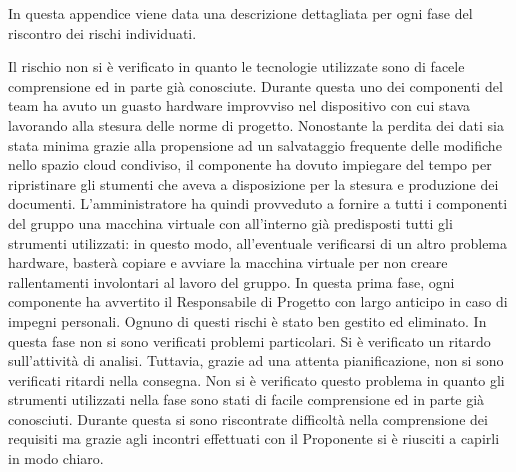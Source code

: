 	In questa appendice viene data una descrizione dettagliata per ogni fase del riscontro dei rischi individuati.


		Il rischio non si è verificato in quanto le tecnologie utilizzate sono di facele comprensione ed in parte già conosciute.
		Durante questa  uno dei componenti del team ha avuto un guasto hardware improvviso nel dispositivo con cui stava lavorando alla stesura delle norme di progetto. Nonostante la perdita dei dati sia stata minima grazie alla propensione ad un salvataggio frequente delle modifiche nello spazio cloud condiviso, il componente ha dovuto impiegare del tempo per ripristinare gli stumenti che aveva a disposizione per la stesura e produzione dei documenti. L'amministratore ha quindi provveduto a fornire a tutti i componenti del gruppo una macchina virtuale con all'interno già predisposti tutti gli strumenti utilizzati: in questo modo, all'eventuale verificarsi di un altro problema hardware, basterà copiare e avviare la macchina virtuale per non creare rallentamenti involontari al lavoro del gruppo.
		In questa prima fase, ogni componente ha avvertito il Responsabile di Progetto con largo anticipo in caso di impegni personali. Ognuno di questi rischi è stato ben gestito ed eliminato.
		In questa fase non si sono verificati problemi particolari.
		Si è verificato un ritardo sull’attività di analisi. Tuttavia, grazie ad una attenta pianificazione, non si sono verificati ritardi nella consegna.
		Non si è verificato questo problema in quanto gli strumenti utilizzati nella fase sono stati di facile comprensione ed in parte già conosciuti.
		Durante questa  si sono riscontrate difficoltà nella comprensione dei requisiti ma grazie agli incontri effettuati con il Proponente si è riusciti a capirli in modo chiaro.
		
